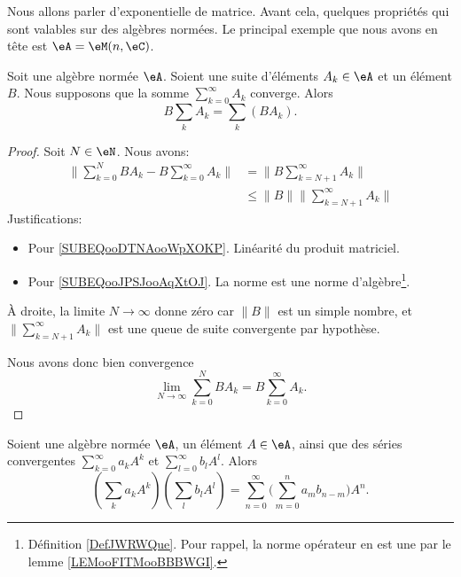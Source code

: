 Nous allons parler d'exponentielle de matrice. Avant cela, quelques propriétés qui sont valables sur des algèbres normées. Le principal exemple que nous avons en tête est \( \eA=\eM(n,\eC)\).

\begin{proposition}      \label{PROPooMZZQooEhQsgQ}
	Soit une algèbre normée \( \eA\). Soient une suite d'éléments \( A_k\in \eA\) et un élément \( B\). Nous supposons que la somme \( \sum_{k=0}^{\infty}A_k\) converge. Alors
	\begin{equation}
		B\sum_kA_k=\sum_k(BA_k).
	\end{equation}
\end{proposition}

\begin{proof}
	Soit \( N\in \eN\). Nous avons:
	\begin{subequations}
		\begin{align}
			\| \sum_{k=0}^NBA_k-B\sum_{k=0}^{\infty}A_k \| & =\| B\sum_{k=N+1}^{\infty}A_k \|            \label{SUBEQooDTNAooWpXOKP} \\
			                                               & \leq \| B \|\| \sum_{k=N+1}^{\infty}A_k \|  \label{SUBEQooJPSJooAqXtOJ}
		\end{align}
	\end{subequations}
	Justifications:
	\begin{itemize}
		\item Pour \eqref{SUBEQooDTNAooWpXOKP}. Linéarité du produit matriciel.
		\item Pour \eqref{SUBEQooJPSJooAqXtOJ}. La norme est une norme d'algèbre\footnote{Définition \ref{DefJWRWQue}. Pour rappel, la norme opérateur en est une par le lemme \ref{LEMooFITMooBBBWGI}.}.
	\end{itemize}
	À droite, la limite \( N\to \infty\) donne zéro car \( \| B \|\) est un simple nombre, et \( \| \sum_{k=N+1}^{\infty}A_k \|\) est une queue de suite convergente par hypothèse.

	Nous avons donc bien convergence
	\begin{equation}
		\lim_{N\to \infty}\sum_{k=0}^{N}BA_k=B\sum_{k=0}^{\infty}A_k.
	\end{equation}
\end{proof}

\begin{proposition}      \label{PROPooFMEXooCNjdhS}
	Soient une algèbre normée \( \eA\), un élément \( A\in \eA\), ainsi que des séries convergentes \( \sum_{k=0}^{\infty}a_kA^k\) et \( \sum_{l=0}^{\infty}b_lA^l\). Alors
	\begin{equation}
		\left( \sum_ka_kA^k \right)\left( \sum_lb_lA^l \right)=\sum_{n=0}^{\infty}\big( \sum_{m=0}^na_mb_{n-m} \big)A^n.
	\end{equation}
\end{proposition}

